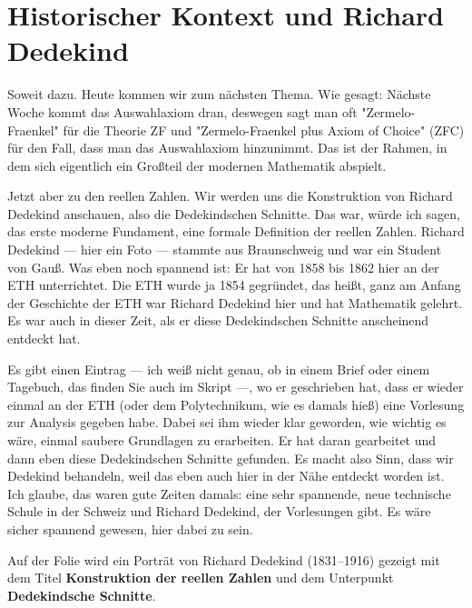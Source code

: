 \section{Historischer Kontext und Richard Dedekind}

\begin{spoken-clean}[00:08:20 - 00:10:45]
Soweit dazu. Heute kommen wir zum nächsten Thema. Wie gesagt: Nächste Woche kommt das Auswahlaxiom dran, deswegen sagt man oft "Zermelo-Fraenkel" für die Theorie ZF und "Zermelo-Fraenkel plus Axiom of Choice" (ZFC) für den Fall, dass man das Auswahlaxiom hinzunimmt. Das ist der Rahmen, in dem sich eigentlich ein Großteil der modernen Mathematik abspielt.

Jetzt aber zu den reellen Zahlen. Wir werden uns die Konstruktion von Richard Dedekind anschauen, also die Dedekindschen Schnitte. Das war, würde ich sagen, das erste moderne Fundament, eine formale Definition der reellen Zahlen. Richard Dedekind --- hier ein Foto --- stammte aus Braunschweig und war ein Student von Gauß. Was eben noch spannend ist: Er hat von 1858 bis 1862 hier an der ETH unterrichtet. Die ETH wurde ja 1854 gegründet, das heißt, ganz am Anfang der Geschichte der ETH war Richard Dedekind hier und hat Mathematik gelehrt. Es war auch in dieser Zeit, als er diese Dedekindschen Schnitte anscheinend entdeckt hat.

Es gibt einen Eintrag --- ich weiß nicht genau, ob in einem Brief oder einem Tagebuch, das finden Sie auch im Skript ---, wo er geschrieben hat, dass er wieder einmal an der ETH (oder dem Polytechnikum, wie es damals hieß) eine Vorlesung zur Analysis gegeben habe. Dabei sei ihm wieder klar geworden, wie wichtig es wäre, einmal saubere Grundlagen zu erarbeiten. Er hat daran gearbeitet und dann eben diese Dedekindschen Schnitte gefunden. Es macht also Sinn, dass wir Dedekind behandeln, weil das eben auch hier in der Nähe entdeckt worden ist. Ich glaube, das waren gute Zeiten damals: eine sehr spannende, neue technische Schule in der Schweiz und Richard Dedekind, der Vorlesungen gibt. Es wäre sicher spannend gewesen, hier dabei zu sein.
\end{spoken-clean}

\begin{meta-note}
Auf der Folie wird ein Porträt von Richard Dedekind (1831–1916) gezeigt mit dem Titel \textbf{Konstruktion der reellen Zahlen} und dem Unterpunkt \textbf{Dedekindsche Schnitte}.
\end{meta-note}

